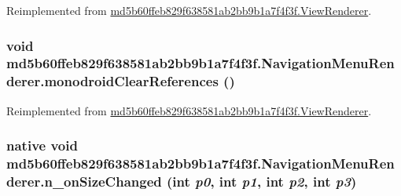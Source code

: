 Reimplemented from \hyperlink{classmd5b60ffeb829f638581ab2bb9b1a7f4f3f_1_1_view_renderer_9ce576208d6e67c5201f21b67a8baf34}{md5b60ffeb829f638581ab2bb9b1a7f4f3f.ViewRenderer}.\hypertarget{classmd5b60ffeb829f638581ab2bb9b1a7f4f3f_1_1_navigation_menu_renderer_8d79995c853bf4f40da4f067cd501048}{
\subsubsection[{monodroidClearReferences}]{\setlength{\rightskip}{0pt plus 5cm}void md5b60ffeb829f638581ab2bb9b1a7f4f3f.NavigationMenuRenderer.monodroidClearReferences ()}}
\label{classmd5b60ffeb829f638581ab2bb9b1a7f4f3f_1_1_navigation_menu_renderer_8d79995c853bf4f40da4f067cd501048}




Reimplemented from \hyperlink{classmd5b60ffeb829f638581ab2bb9b1a7f4f3f_1_1_view_renderer_a03a52443eaab5b1890013945129a8e2}{md5b60ffeb829f638581ab2bb9b1a7f4f3f.ViewRenderer}.\hypertarget{classmd5b60ffeb829f638581ab2bb9b1a7f4f3f_1_1_navigation_menu_renderer_cb580f3aa63c0893ea67733b7dd1de9a}{
\subsubsection[{n\_\-onSizeChanged}]{\setlength{\rightskip}{0pt plus 5cm}native void md5b60ffeb829f638581ab2bb9b1a7f4f3f.NavigationMenuRenderer.n\_\-onSizeChanged (int {\em p0}, \/  int {\em p1}, \/  int {\em p2}, \/  int {\em p3})}}
\label{classmd5b60ffeb829f638581ab2bb9b1a7f4f3f_1_1_navigation_menu_renderer_cb580f3aa63c0893ea67733b7dd1de9a}


